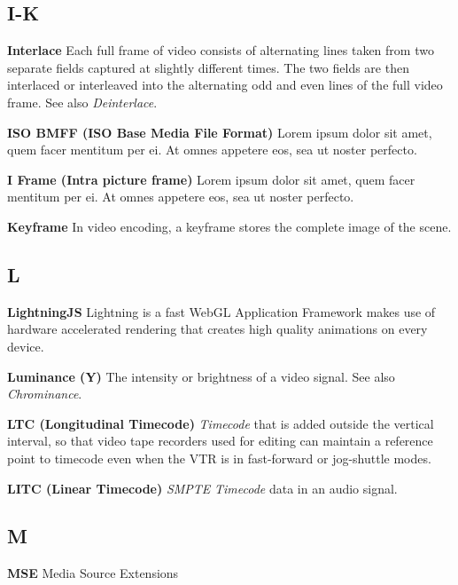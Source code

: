 \subsection{I-K}

\smallskip
\textbf{Interlace}
Each full frame of video consists of alternating lines taken from two separate fields captured at slightly different times. The two fields are then interlaced or interleaved into the alternating odd and even lines of the full video frame.  See also \textit{Deinterlace}.

\smallskip
\textbf{ISO BMFF (ISO Base Media File Format)}
Lorem ipsum dolor sit amet, quem facer mentitum per ei. At omnes appetere eos, sea ut noster perfecto.

\smallskip
\textbf{I Frame (Intra picture frame)}
Lorem ipsum dolor sit amet, quem facer mentitum per ei. At omnes appetere eos, sea ut noster perfecto.

\smallskip
\textbf{Keyframe}
In video encoding, a keyframe stores the complete image of the scene.



\subsection{L}

\smallskip
\textbf{LightningJS}
Lightning is a fast WebGL Application Framework makes use of hardware accelerated rendering that creates high quality animations on every device.

\smallskip
\textbf{Luminance (Y)}
The intensity or brightness of a video signal. See also \textit{Chrominance}.

\smallskip
\textbf{LTC (Longitudinal Timecode)}
\textit{Timecode} that is added outside the vertical interval, so that video tape recorders used for editing can maintain a reference point to timecode even when the VTR is in fast-forward or jog-shuttle modes.

\smallskip
\textbf{LITC (Linear Timecode)}
\textit{SMPTE} \textit{Timecode} data in an audio signal.

\subsection{M}

\smallskip
\textbf{MSE}
Media Source Extensions

